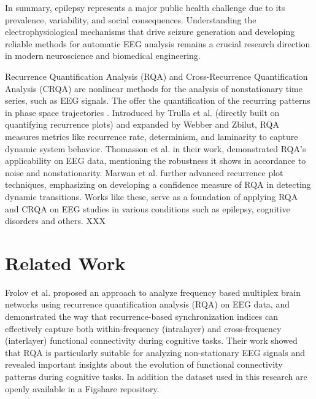\documentclass{article}
\begin{document}
	In summary, epilepsy represents a major public health challenge due to its prevalence, 
	variability, and social consequences. Understanding the electrophysiological mechanisms 
	that drive seizure generation and developing reliable methods for automatic EEG analysis 
	remains a crucial research direction in modern neuroscience and biomedical engineering.

	Recurrence Quantification Analysis (RQA) and Cross-Recurrence Quantification Analysis (CRQA) are
	nonlinear methods for the analysis of nonstationary time series, such as EEG signals. 
	The offer the quantification of the recurring patterns in phase space trajectories \cite{trulla1996, webber2005}. 
	Introduced by Trulla et al.\cite{trulla1996} (directly built on quantifying recurrence plots\cite{eckmann1987}) 
	and expanded by Webber and Zbilut\cite{webber2005}, RQA measures metrics 
	like recurrence rate, determinism, and laminarity to capture dynamic system behavior. 
	Thomasson et al.\cite{thomasson2002} in their work, demonstrated RQA’s applicability on EEG data, mentioning 
	the robustness it shows in accordance to noise
	and nonstationarity. Marwan et al.\cite{marwan2013} further advanced recurrence plot techniques,
	emphasizing on developing a confidence measure of RQA in detecting dynamic transitions.
	Works like these, serve as a foundation of applying RQA and CRQA on EEG 
	studies in various conditions such as epilepsy, cognitive disorders and others. XXX

	\section{Related Work}
			Frolov et al.\cite{frolov} proposed an approach to analyze frequency based multiplex brain networks
			using recurrence quantification analysis (RQA) 
			on EEG data, and demonstrated the way that recurrence-based 
			synchronization indices can effectively capture 
			both within-frequency (intralayer) and cross-frequency (interlayer) 
			functional connectivity during cognitive tasks. 
			Their work showed that RQA is particularly suitable for analyzing 
			non-stationary EEG signals and revealed
			important insights about the evolution of functional connectivity 
			patterns during cognitive tasks. In addition the dataset
			used in this research are openly available in a Figshare repository.
\end{document}
